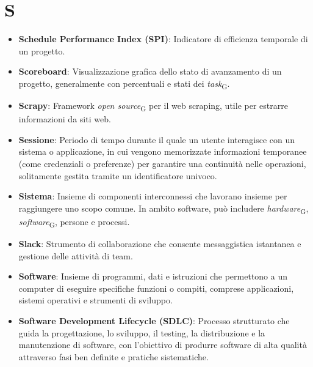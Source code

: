 \section{S}
\begin{itemize}
    \item \textbf{Schedule Performance Index (SPI)}: Indicatore di efficienza temporale di un progetto.
    \item \textbf{Scoreboard}: Visualizzazione grafica dello stato di avanzamento di un progetto, generalmente con percentuali e stati dei \textit{task}\textsubscript{G}.
    \item \textbf{Scrapy}: Framework \textit{open source}\textsubscript{G} per il web scraping, utile per estrarre informazioni da siti web.
    \item \textbf{Sessione}: Periodo di tempo durante il quale un utente interagisce con un sistema o applicazione, in cui vengono memorizzate informazioni temporanee (come credenziali o preferenze) per garantire una continuità nelle operazioni, solitamente gestita tramite un identificatore univoco.
    \item \textbf{Sistema}: Insieme di componenti interconnessi che lavorano insieme per raggiungere uno scopo comune. In ambito software, può includere \textit{hardware}\textsubscript{G}, \textit{software}\textsubscript{G}, persone e processi.
    \item \textbf{Slack}: Strumento di collaborazione che consente messaggistica istantanea e gestione delle attività di team.
    \item \textbf{Software}: Insieme di programmi, dati e istruzioni che permettono a un computer di eseguire specifiche funzioni o compiti, comprese applicazioni, sistemi operativi e strumenti di sviluppo.
    \item \textbf{Software Development Lifecycle (SDLC)}: Processo strutturato che guida la progettazione, lo sviluppo, il testing, la distribuzione e la manutenzione di software, con l'obiettivo di produrre software di alta qualità attraverso fasi ben definite e pratiche sistematiche.

\end{itemize}
